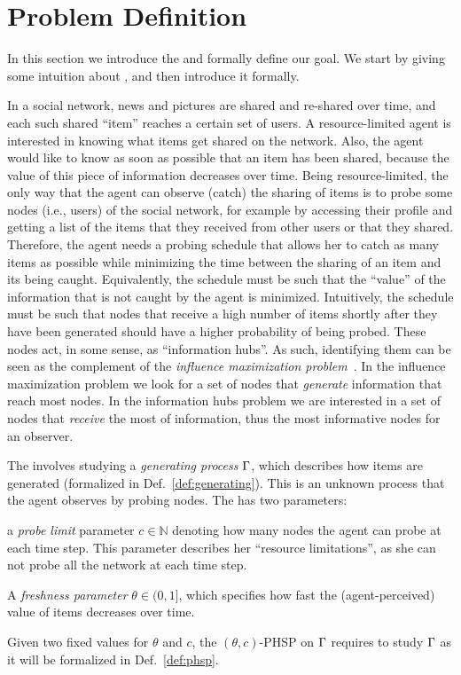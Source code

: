 \section{Problem Definition}\label{sec:prelims}
In this section we introduce the \probname and formally define our goal. We
start by giving some intuition about \probname, and then introduce it formally.

In a social network, news and pictures are shared and re-shared over time, and
each such shared ``item'' reaches a certain set of users. A resource-limited
agent is interested in knowing what items get shared on the network. Also, the
agent would like to know as soon as possible that an item has been shared,
because the value of this piece of information decreases over time. Being
resource-limited, the only way that the agent can observe (catch) the sharing of
items is to probe some nodes (i.e., users) of the social network, for example by
accessing their profile and getting a list of the items that they received from
other users or that they shared. Therefore, the agent needs a probing schedule
that allows her to catch as many items as possible while minimizing the time
between the sharing of an item and its being caught. Equivalently, the schedule
must be such that the ``value'' of the information that is not caught by the
agent is minimized. Intuitively, the schedule must be such that nodes that
receive a high number of items shortly after they have been generated should
have a higher probability of being probed. These nodes act, in some sense, as
``information hubs''. As such, identifying them can be seen as the complement of
the \emph{influence maximization problem}~\citep{Kempe2003,Kempe2005}. In the
influence maximization problem we look for a set of nodes that \emph{generate}
information that reach most nodes. In the information hubs problem we are
interested in a set of nodes that \emph{receive} the most of information, thus
the most informative nodes for an observer.

The \probname involves studying a \emph{generating process} $\Gamma$, which
describes how items are generated (formalized in Def.~\ref{def:generating}).
This is an unknown process that the agent observes by probing nodes. The
\probname has two parameters:
\begin{itemize*}
	\item a \emph{probe limit} parameter $c\in\mathbb{N}$ denoting how many
		nodes the agent can probe at each time step. This parameter describes
		her ``resource limitations'', as she can not probe all the network at
		each time step.
	\item A \emph{freshness parameter} $\theta\in(0,1]$, which specifies
		how fast the (agent-perceived) value of items decreases over time.
\end{itemize*}
Given two fixed values for $\theta$ and $c$, the $(\theta,c)$-PHSP on $\Gamma$
requires to study $\Gamma$ as it will be formalized in Def.~\ref{def:phsp}.

